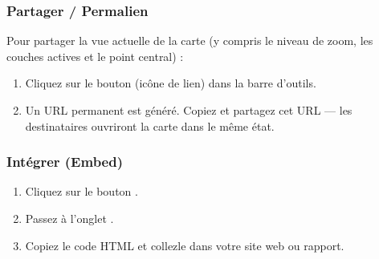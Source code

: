\documentclass[letterpaper,10pt,english]{sphinxmanual}
\begin{document}
\subsubsection{Partager / Permalien}
\label{\detokenize{fr/04_explorer_cartes:partager-permalien}}
\sphinxAtStartPar
Pour partager la vue actuelle de la carte (y compris le niveau de zoom, les couches
actives et le point central) :
\begin{enumerate}
%
\item {} 
\sphinxAtStartPar
Cliquez sur le bouton  (icône de lien) dans la barre d’outils.

\item {} 
\sphinxAtStartPar
Un URL permanent est généré. Copiez et partagez cet URL — les destinataires
ouvriront la carte dans le même état.

\end{enumerate}


\subsubsection{Intégrer (Embed)}
\label{\detokenize{fr/04_explorer_cartes:integrer-embed}}\begin{enumerate}
%
\item {} 
\sphinxAtStartPar
Cliquez sur le bouton .

\item {} 
\sphinxAtStartPar
Passez à l’onglet .

\item {} 
\sphinxAtStartPar
Copiez le code HTML  et collez\sphinxhyphen{}le dans votre site web ou rapport.

\end{enumerate}
\end{document}
